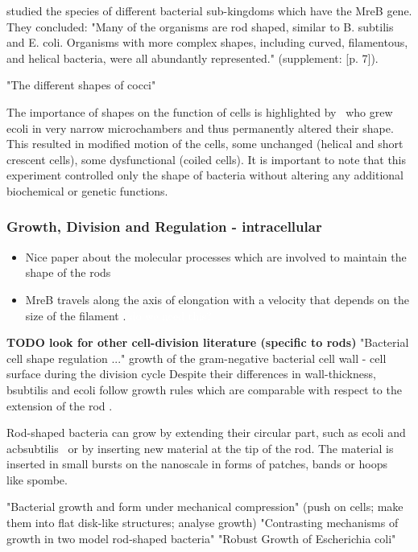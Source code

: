 \documentclass{article}
\newcommand{\todo}[1]{\colorbox{WildStrawberry}{\textcolor{white}{#1}}}
\begin{document}
\cite{Jones2001} studied the species of different bacterial sub-kingdoms which have the MreB gene.
They concluded: "Many of the organisms are rod shaped, similar to B. subtilis and E. coli.
Organisms with more complex shapes, including curved, filamentous, and helical bacteria, were all abundantly represented." \cite{Jones2001} (supplement: [p. 7]).

\cite{Zapun2008} "The different shapes of cocci"

The importance of shapes on the function of cells is highlighted by~\cite{Takeuchi2005} who grew
\ac{ecoli} in very narrow microchambers and thus permanently altered their shape.
This resulted in modified motion of the cells, some unchanged (helical and short crescent cells),
some dysfunctional (coiled cells).
It is important to note that this experiment controlled only the shape of bacteria without altering
any additional biochemical or genetic functions.

\subsubsection{Growth, Division and Regulation - intracellular}

\begin{itemize}
    \item \cite{DenBlaauwen2008} Nice paper about the molecular processes which are involved to maintain the shape of the rods
    \item MreB travels along the axis of elongation with a velocity that depends on the size of the filament \cite{Olshausen2013}. \todo{do we need this?}
\end{itemize}

\textbf{TODO look for other cell-division literature (specific to rods)} 
\cite{Lleo1990} "Bacterial cell shape regulation ..." \cite{Cooper1991}   growth of the gram-negative bacterial cell wall - cell surface during the division cycle 
Despite their differences in wall-thickness, \ac{bsubtilis} and \ac{ecoli} follow growth rules which are
comparable with respect to the extension of the rod \cite{Chang2014}.

Rod-shaped bacteria can grow by extending their circular part, such as \ac{ecoli} and ac{bsubtilis}~\cite{Errington2020} or by inserting new material at the tip of the rod.
The material is inserted in small bursts on the nanoscale in forms of patches, bands or hoops~\cite{DePedro2003} like \ac{spombe}.

\cite{Si2015} "Bacterial growth and form under mechanical compression" (push on cells; make them into flat disk-like structures; analyse growth)
\cite{Billaudeau2017} "Contrasting mechanisms of growth in two model rod-shaped bacteria"
\cite{Wang2010_2} "Robust Growth of Escherichia coli"
\end{document}
